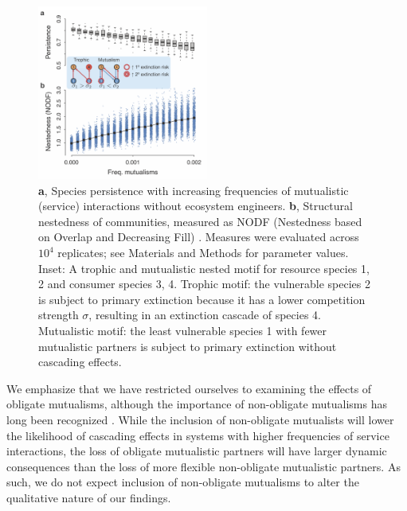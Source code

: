 \documentclass[twocolumn,preprintnumbers,amsmath,amssymb,superscriptaddress,linenumbers]{revtex4-1}
\begin{document}
\begin{figure}[h!]
\centering
\includegraphics[width=0.5\textwidth]{fig_nested.png}
\vspace{0mm}
\caption{
\textbf{a}, Species persistence with increasing frequencies of mutualistic (service) interactions without ecosystem engineers.
\textbf{b}, Structural nestedness of communities, measured as NODF (Nestedness based on Overlap and Decreasing Fill) \cite{AlmeidaNeto2008}.
Measures were evaluated across $10^4$ replicates; see Materials and Methods for parameter values.
Inset: A trophic and mutualistic nested motif for resource species 1, 2 and consumer species 3, 4.
Trophic motif: the vulnerable species 2 is subject to primary extinction because it has a lower competition strength $\sigma$, resulting in an extinction cascade of species 4.
Mutualistic motif: the least vulnerable species 1 with fewer mutualistic partners is subject to primary extinction without cascading effects.
\vspace{0mm}
}
\label{fig:nest}
\end{figure}


We emphasize that we have restricted ourselves to examining the effects of obligate mutualisms, although the importance of non-obligate mutualisms has long been recognized \cite{Ramos2012,Vieira2015,Valdovinos2016,Ponisio2017,Valdovinos2019}.
While the inclusion of non-obligate mutualists will lower the likelihood of cascading effects in systems with higher frequencies of service interactions, the loss of obligate mutualistic partners will have larger dynamic consequences than the loss of more flexible non-obligate mutualistic partners.
As such, we do not expect inclusion of non-obligate mutualisms to alter the qualitative nature of our findings.\\
\end{document}
